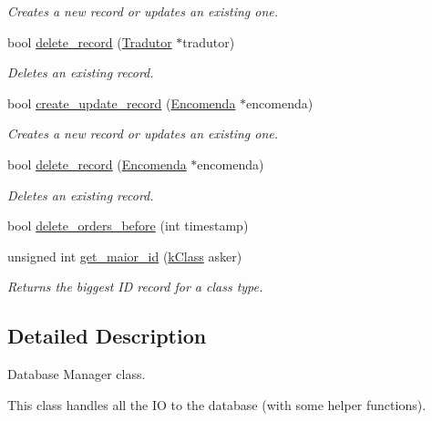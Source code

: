 \begin{DoxyCompactItemize}
\begin{DoxyCompactList}\small\item\em Creates a new record or updates an existing one. \end{DoxyCompactList}\item 
bool \hyperlink{class_database_manager_a861c8ab275b7d9e100ebb71889578c40}{delete\-\_\-record} (\hyperlink{class_tradutor}{Tradutor} $\ast$tradutor)
\begin{DoxyCompactList}\small\item\em Deletes an existing record. \end{DoxyCompactList}\item 
bool \hyperlink{class_database_manager_a10fd54af873e6902a3a6ee45f71eb42c}{create\-\_\-update\-\_\-record} (\hyperlink{class_encomenda}{Encomenda} $\ast$encomenda)
\begin{DoxyCompactList}\small\item\em Creates a new record or updates an existing one. \end{DoxyCompactList}\item 
bool \hyperlink{class_database_manager_aa78e5396d0be88098a97703f31fb72ec}{delete\-\_\-record} (\hyperlink{class_encomenda}{Encomenda} $\ast$encomenda)
\begin{DoxyCompactList}\small\item\em Deletes an existing record. \end{DoxyCompactList}\item 
bool \hyperlink{class_database_manager_ab1c3330c1db922baf135103db0527fa8}{delete\-\_\-orders\-\_\-before} (int timestamp)
\item 
unsigned int \hyperlink{class_database_manager_a5af3db3952fc2af64a43fd0403138c04}{get\-\_\-maior\-\_\-id} (\hyperlink{_database_manager_8h_ad36b2b2507c9846942e0b412d07e5438}{k\-Class} asker)
\begin{DoxyCompactList}\small\item\em Returns the biggest I\-D record for a class type. \end{DoxyCompactList}\end{DoxyCompactItemize}


\subsection{Detailed Description}
Database Manager class. 

This class handles all the I\-O to the database (with some helper functions). 

